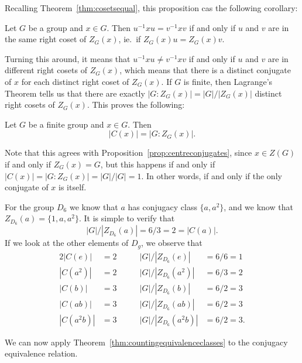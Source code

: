 Recalling Theorem~\ref{thm:cosetsequal}, this proposition cas the 
following corollary:

\begin{corollary}
  Let $G$ be a group and $x \in G$.  Then $u^{-1}xu = v^{-1}xv$ if 
  and only if $u$ and $v$ are in the same right coset of $Z_{G}(x)$, 
  ie.~if $Z_{G}(x)u = Z_{G}(x)v$.
\end{corollary}

Turning this around, it means that $u^{-1}xu \ne v^{-1}xv$ if and only
if $u$ and $v$ are in different right cosets of $Z_{G}(x)$, which
means that there is a distinct conjugate of $x$ for each distinct
right coset of $Z_{G}(x)$.  If $G$ is finite, then Lagrange's Theorem
tells us that there are exactly $|G : Z_{G}(x)| = |G|/|Z_{G}(x)|$ 
distinct right cosets of $Z_{G}(x)$.  This proves the following:

\begin{corollary}\label{cor:conjugacyclasssize}
  Let $G$ be a finite group and $x \in G$.  Then
  \[
    |C(x)| = |G : Z_{G}(x)|.
  \]
\end{corollary}

Note that this agrees with Proposition~\ref{prop:centreconjugates}, 
since $x \in Z(G)$ if and only if $Z_{G}(x) = G$, but this happens if 
and only if $|C(x)| = |G : Z_{G}(x)| = |G|/|G| = 1$.  In other words, 
if and only if the only conjugate of $x$ is itself.

\begin{example}
  For the group $D_{6}$ we know that $a$ has conjugacy class $\{a, 
  a^{2}\}$, and we know that $Z_{D_{6}}(a) = \{1, a, a^{2}\}$.  It is 
  simple to verify that
  \[
    |G|/|Z_{D_{6}}(a)| = 6/3 = 2 = |C(a)|.
  \]
  If we look at the other elements of $D_{g}$, we observe that
  \begin{alignat*}{2}
    |C(e)| &= 2 &\qquad |G|/|Z_{D_{6}}(e)| &= 6/6 = 1 \\
    |C(a^{2})| &= 2 &\qquad |G|/|Z_{D_{6}}(a^{2})| &= 6/3 = 2 \\
    |C(b)| &= 3 &\qquad |G|/|Z_{D_{6}}(b)| &= 6/2 = 3 \\
    |C(ab)| &= 3 &\qquad |G|/|Z_{D_{6}}(ab)| &= 6/2 = 3 \\
    |C(a^{2}b)| &= 3 &\qquad |G|/|Z_{D_{6}}(a^{2}b)| &= 6/2 = 3.
  \end{alignat*}
\end{example}

We can now apply Theorem~\ref{thm:countingequivalenceclasses} to the 
conjugacy equivalence relation.


